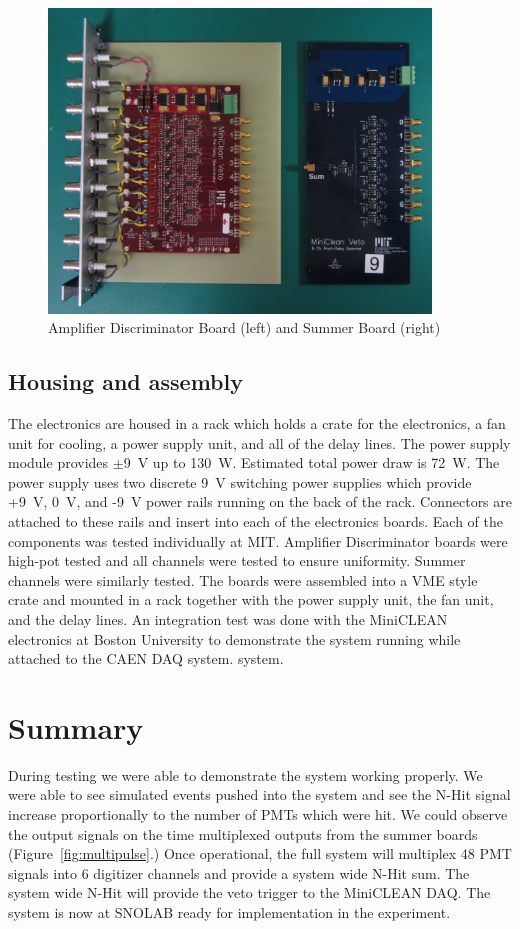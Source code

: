 \documentclass{JINST}
\begin{document}
\begin{figure}[ht]
\begin{center}
\includegraphics[width=4in, keepaspectratio=true]{graphics/boards.JPG}
\caption{Amplifier Discriminator Board (left) and Summer Board (right)
\label{fig:boards}}
\end{center}
\end{figure}

\subsection{Housing and assembly}
\label{sec:Housing}
%
The electronics are housed in a rack which holds a crate for the
electronics, a fan unit for cooling, a power supply unit, and all of
the delay lines.  The power supply module provides $\pm$9~V up to
130~W.  Estimated total power draw is 72~W.  The power supply uses two
discrete 9~V switching power supplies which provide +9~V, 0~V, and -9~V
power rails running on the back of the rack.  Connectors are attached
to these rails and insert into each of the electronics boards.  Each
of the components was tested individually at MIT.  Amplifier
Discriminator boards were high-pot tested and all channels were tested
to ensure uniformity.  Summer channels were similarly tested.  The
boards were assembled into a VME style crate and mounted in a rack
together with the power supply unit, the fan unit, and the delay
lines.  An integration test was done with the MiniCLEAN electronics
at Boston University to
demonstrate the system running while attached to the CAEN DAQ system.
system.

\section{Summary}
\label{Summary}
%
During testing we were able to demonstrate the system working
properly.  We were able to see simulated events pushed into the system
and see the N-Hit signal increase proportionally to the number of PMTs
which were hit.  We could observe the output signals on the time
multiplexed outputs from the summer boards (Figure~\ref{fig:multipulse}.)
Once operational, the
full system will multiplex 48 PMT signals into 6 digitizer channels
and provide a system wide N-Hit sum.  The system wide N-Hit will
provide the veto trigger to the MiniCLEAN DAQ.  The system is now at
SNOLAB ready for implementation in the experiment.
\end{document}
